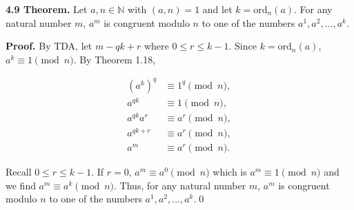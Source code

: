 \documentclass[12pt]{article}
\begin{document}
\noindent\textbf{4.9 Theorem.} Let $a,n\in\mathbb{N}$ with $(a,n)=1$ and let $k=\text{ord}_n(a)$. For any natural number $m$, $a^m$ is congruent modulo $n$ to one of the numbers $a^1,a^2,...,a^k$. 

\bigskip

\noindent\textbf{Proof.} By TDA, let $m-qk+r$ where $0\leq r\leq k-1$. Since $k=\text{ord}_n(a)$, $a^k\equiv 1\pmod n$. By Theorem 1.18,

\begin{align*}
(a^k)^q &\equiv 1^q\pmod n,\\
a^{qk} &\equiv 1\pmod n,\\
a^{qk}a^r &\equiv a^r\pmod n,\\
a^{qk+r} &\equiv a^r\pmod n,\\
a^m &\equiv a^r\pmod n.
\end{align*}

\noindent Recall $0\leq r\leq k-1$. If $r=0$, $a^m\equiv a^0\pmod n$ which is $a^m\equiv 1\pmod n$ and we find $a^m\equiv a^k\pmod n$. Thus, for any natural number $m$, $a^m$ is congruent modulo $n$ to one of the numbers $a^1,a^2,...,a^k$.\qed
\end{document}
